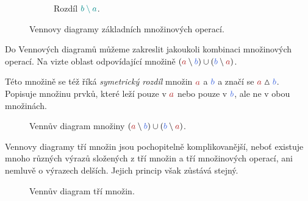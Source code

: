 \begin{figure}[ht]
\begin{subfigure}[b]{.45\textwidth}
    \caption{Rozdíl $\clc{b \setminus a}$.}
  \end{subfigure}
  \caption{Vennovy diagramy základních množinových operací.}
  \label{fig:vennuv-diagram-2}
\end{figure}

\begin{example}
  \label{exam:vennuv-diagram-sym-rozdilu}
  Do Vennových diagramů můžeme zakreslit jakoukoli kombinaci množinových
  operací. Na  vizte oblast odpovídající
  množině $(\clr{a} \setminus \clb{b}) \cup (\clb{b} \setminus \clr{a})$.

  Této množině se též říká \emph{symetrický rozdíl} množin $\clr{a}$ a $\clb{b}$
  a značí se $\clr{a} \vartriangle \clb{b}$. Popisuje množinu prvků, které leží
  pouze v $\clr{a}$ nebo pouze v $\clb{b}$, ale ne v obou množinách.
\end{example}

\begin{figure}[ht]
  \centering

  \caption{Vennův diagram množiny $(\clr{a} \setminus \clb{b}) \cup (\clb{b}
  \setminus \clr{a})$.}
  \label{fig:vennuv-diagram-3}
\end{figure}

Vennovy diagramy tří množin jsou pochopitelně komplikovanější, neboť existuje
mnoho různých výrazů složených z tří množin a tří množinových operací, ani
nemluvě o výrazech delších. Jejich princip však zůstává stejný.

\begin{figure}[ht]
  \centering

  \caption{Vennův diagram tří množin.}
  \label{fig:vennuv-diagram-tri-1}
\end{figure}

